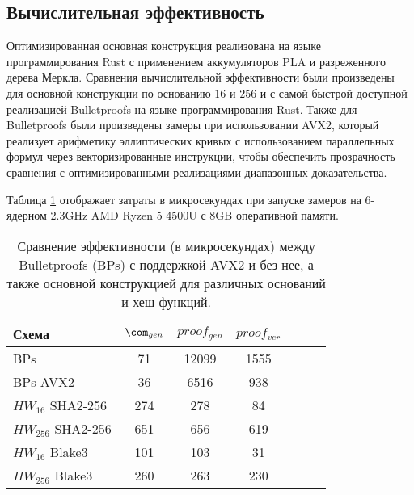 \subsection{Вычислительная эффективность} %
Оптимизированная основная конструкция реализована на языке программирования Rust с применением аккумуляторов PLA и разреженного дерева Меркла.
Сравнения вычислительной эффективности были произведены для основной конструкции по основанию $16$ и $256$ и с самой быстрой доступной реализацией Bulletproofs на языке программирования Rust.
Также для Bulletproofs были произведены замеры при использовании AVX2, который реализует арифметику эллиптических кривых с использованием параллельных формул через векторизированные инструкции, чтобы обеспечить прозрачность сравнения с оптимизированными реализациями диапазонных доказательства.

Таблица \ref{table:2} отображает затраты в микросекундах при запуске замеров на 6-ядерном 2.3GHz AMD Ryzen 5 4500U с 8GB оперативной памяти.

\begin{table}[h]
	\centering
    \begin{tabular}{|l|c|c|c|c|c|c|}
        \hline
		Схема               & $\com_{gen}$ & $proof_{gen}$ & $proof_{ver}$ \\ \hline
        BPs                 & 71           & 12099         & 1555          \\ \hline
        BPs AVX2            & 36           & 6516          & 938           \\ \hline
        $HW_{16}$  SHA2-256 & 274          & 278           & 84            \\ \hline
        $HW_{256}$ SHA2-256 & 651          & 656           & 619           \\ \hline
        $HW_{16}$  Blake3   & 101          & 103           & 31            \\ \hline
        $HW_{256}$ Blake3   & 260          & 263           & 230           \\ \hline
    \end{tabular}
	\label{table:2}
	\caption{Сравнение эффективности (в микросекундах) между Bulletproofs (BPs) с поддержкой AVX2 и без нее, а также основной конструкцией для различных оснований и хеш-функций.}
\end{table}

